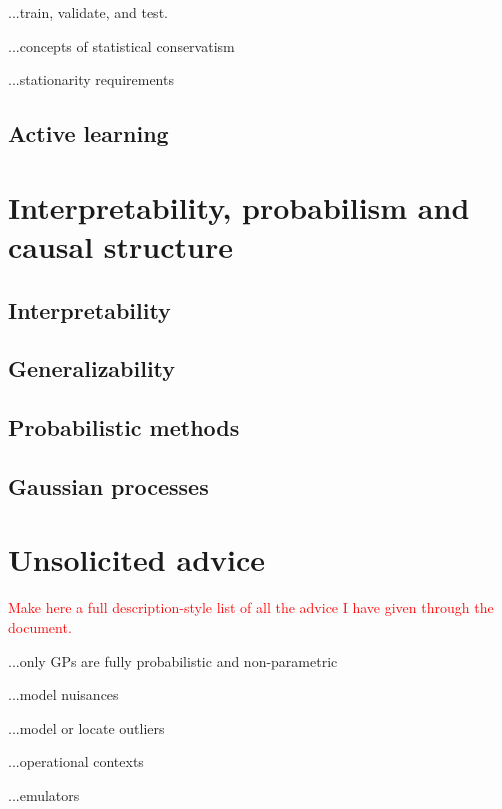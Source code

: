 \documentclass[12pt, twoside, letterpaper]{article}
\newcommand{\todo}[1]{\textcolor{red}{#1}}  %
\begin{document}
...train, validate, and test.

...concepts of statistical conservatism

...stationarity requirements

\subsection{Active learning}

\section{Interpretability, probabilism and causal structure}

\subsection{Interpretability}

\subsection{Generalizability}

\subsection{Probabilistic methods}

\subsection{Gaussian processes}

\section{Unsolicited advice}\label{sec:advice}

\todo{Make here a full description-style list of all the
  advice I have given through the document.}

...only GPs are fully probabilistic and non-parametric

...model nuisances

...model or locate outliers

...operational contexts

...emulators
\end{document}
